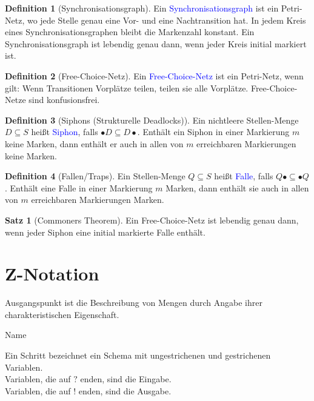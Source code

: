 \documentclass{scrreprt}
\theoremstyle{definition}
\newtheorem{Definition}{Definition}[section]
\newtheorem{Satz}{Satz}[section]
\theoremstyle{example}
\theoremstyle{algorithm}
\begin{document}
\begin{Definition}[Synchronisationsgraph]
Ein \textcolor{blue}{Synchronisationsgraph} ist ein Petri-Netz, wo jede Stelle genau eine Vor- und eine Nachtransition hat. In jedem Kreis eines Synchronisationsgraphen bleibt die Markenzahl konstant. Ein Synchronisationsgraph ist lebendig genau dann, wenn jeder Kreis initial markiert ist.
\end{Definition}

\begin{Definition}[Free-Choice-Netz]
Ein \textcolor{blue}{Free-Choice-Netz} ist ein Petri-Netz, wenn gilt: Wenn Transitionen Vorplätze teilen, teilen sie alle Vorplätze. Free-Choice-Netze sind konfusionsfrei.
\end{Definition}

\begin{Definition}[Siphons (Strukturelle Deadlocks)]
Ein nichtleere Stellen-Menge $D\subseteq S$ heißt \textcolor{blue}{Siphon}, falls $\bullet D \subseteq D\bullet$. Enthält ein Siphon in einer Markierung $m$ keine Marken, dann enthält er auch in allen von $m$ erreichbaren Markierungen keine Marken.
\end{Definition}

\begin{Definition}[Fallen/Traps]
Ein Stellen-Menge $Q\subseteq S$ heißt \textcolor{blue}{Falle}, falls $Q\bullet \subseteq \bullet Q$. Enthält eine Falle in einer Markierung $m$ Marken, dann enthält sie auch in allen von $m$ erreichbaren Markierungen Marken.
\end{Definition}

\begin{Satz}[Commoners Theorem]
Ein Free-Choice-Netz ist lebendig genau dann, wenn jeder Siphon eine initial markierte Falle enthält.
\end{Satz}

\section{Z-Notation}
Ausgangspunkt ist die Beschreibung von Mengen durch Angabe ihrer charakteristischen Eigenschaft.
\begin{schema}{Name}
\where
{}
\end{schema}
Ein Schritt bezeichnet ein Schema mit ungestrichenen und gestrichenen Variablen.\\
Variablen, die auf $?$ enden, sind die Eingabe.\\
Variablen, die auf $!$ enden, sind die Ausgabe.\\
\end{document}
